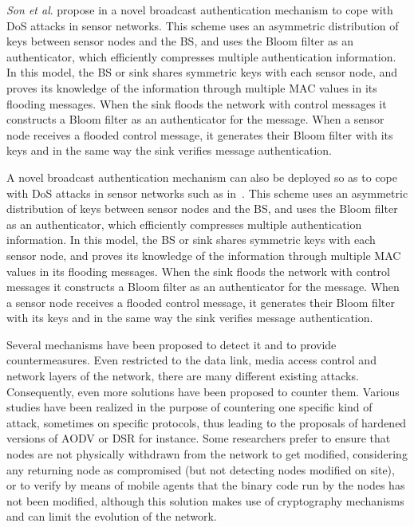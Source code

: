 
\textit{Son et al}. propose in
\cite{JS10}
a novel broadcast authentication mechanism to cope with DoS attacks in sensor networks.
This scheme uses an asymmetric distribution of keys between sensor nodes and the BS, and uses the Bloom filter as an authenticator, which efficiently compresses multiple authentication information.
In this model, the BS or sink shares symmetric keys with each sensor node, and proves its knowledge of the information through multiple MAC values in its flooding messages.
When the sink floods the network with control messages it constructs a Bloom filter as an authenticator for the message.
When a sensor node receives a flooded control message, it generates their Bloom filter with its keys and in the same way the sink verifies message authentication.

A novel broadcast authentication mechanism can also be deployed so as to cope with DoS attacks in sensor networks such as in~\cite{SLS10}.
This scheme uses an asymmetric distribution of keys between sensor nodes and the BS, and uses the Bloom filter as an authenticator, which efficiently compresses multiple authentication information.
In this model, the BS or sink shares symmetric keys with each sensor node, and proves its knowledge of the information through multiple MAC values in its flooding messages.
When the sink floods the network with control messages it constructs a Bloom filter as an authenticator for the message.
When a sensor node receives a flooded control message, it generates their Bloom filter with its keys and in the same way the sink verifies message authentication.




Several mechanisms have been proposed to detect it and to provide countermeasures\cite{SSS11,RM11}.
Even restricted to the data link, media access control and network layers of the network, there are many different existing \DoS attacks.
Consequently, even more solutions have been proposed to counter them.
Various studies have been realized in the purpose of countering one specific kind of attack, sometimes on specific protocols, thus leading to the proposals of hardened versions of AODV\cite{DLA02} or DSR\cite{CT04} for instance.
Some researchers prefer to ensure that nodes are not physically withdrawn from the network to get modified\cite{Ho10}, considering any returning node as compromised (but not detecting nodes modified on site), or to verify by means of mobile agents that the binary code run by the nodes has not been modified\cite{HR13}, although this solution makes use of cryptography mechanisms and can limit the evolution of the network.

